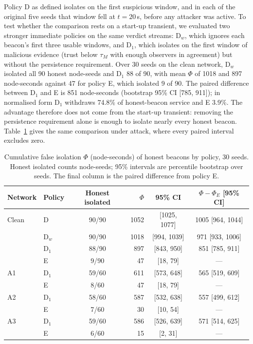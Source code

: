 Policy D as defined isolates on the first suspicious window, and in each
of the original five seeds that window fell at $t = 20$\,s, before any
attacker was active. To
test whether the comparison rests on a start-up transient, we evaluated
two stronger immediate policies on the same verdict streams: D$_w$, which
ignores each beacon's first three usable windows, and D$_1$, which isolates
on the first window of malicious evidence (trust below $\tau_M$ with
enough observers in agreement) but without the persistence requirement.
Over 30 seeds on the clean network, D$_w$ isolated all 90 honest
node-seeds and D$_1$ 88 of 90, with mean $\Phi$ of 1018 and 897
node-seconds against 47 for policy E, which isolated 9 of 90. The paired
difference between D$_1$ and E is 851 node-seconds (bootstrap 95\% CI
[785, 911]); in normalised form D$_1$ withdraws 74.8\% of honest-beacon
service and E 3.9\%. The advantage therefore does not come from the
start-up transient: removing the persistence requirement alone is enough to
isolate nearly every honest beacon.
Table~\ref{tab:phivariants} gives the same comparison under attack, where
every paired interval excludes zero.

\begin{table}[!t]
\caption{Cumulative false isolation $\Phi$ (node-seconds) of honest beacons
by policy, 30 seeds. Honest isolated counts node-seeds; 95\% intervals
are percentile bootstrap over seeds. The final column is the paired
difference from policy E.}
\label{tab:phivariants}
\centering
\small
\setlength{\tabcolsep}{4pt}
\begin{tabular}{@{}llcrcc@{}}
\hline
Network & Policy & Honest isolated & $\Phi$ & 95\% CI & $\Phi - \Phi_E$ [95\% CI] \\
\hline
Clean & D     & 90/90 & 1052 & [1025, 1077] & 1005 [964, 1044] \\
      & D$_w$ & 90/90 & 1018 & [994, 1039]  & 971 [933, 1006] \\
      & D$_1$ & 88/90 & 897  & [843, 950]   & 851 [785, 911] \\
      & E     & 9/90  & 47   & [18, 79]     & --- \\
A1    & D$_1$ & 59/60 & 611  & [573, 648]   & 565 [519, 609] \\
      & E     & 8/60  & 47   & [18, 79]     & --- \\
A2    & D$_1$ & 58/60 & 587  & [532, 638]   & 557 [499, 612] \\
      & E     & 7/60  & 30   & [10, 54]     & --- \\
A3    & D$_1$ & 59/60 & 586  & [526, 639]   & 571 [514, 625] \\
      & E     & 6/60  & 15   & [2, 31]      & --- \\
\hline
\end{tabular}
\end{table}


